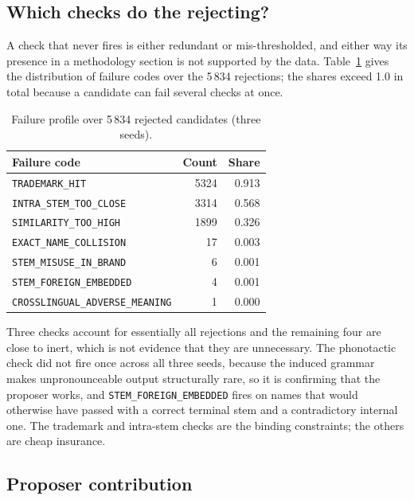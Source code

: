 \documentclass[conference]{IEEEtran}
\newcommand{\code}[1]{\texttt{\footnotesize #1}}
\begin{document}
\subsection{Which checks do the rejecting?}

A check that never fires is either redundant or mis-thresholded, and either way
its presence in a methodology section is not supported by the data.
Table~\ref{tab:failures} gives the distribution of failure codes over the
5\,834 rejections; the shares exceed 1.0 in total because a candidate can fail
several checks at once.

\begin{table}[t]
\caption{Failure profile over 5\,834 rejected candidates (three seeds).}
\label{tab:failures}
\centering
\scriptsize
\begin{tabular}{lrr}
\toprule
Failure code & Count & Share \\
\midrule
\code{TRADEMARK\_HIT}                & 5324 & 0.913 \\
\code{INTRA\_STEM\_TOO\_CLOSE}       & 3314 & 0.568 \\
\code{SIMILARITY\_TOO\_HIGH}         & 1899 & 0.326 \\
\code{EXACT\_NAME\_COLLISION}        &   17 & 0.003 \\
\code{STEM\_MISUSE\_IN\_BRAND}       &    6 & 0.001 \\
\code{STEM\_FOREIGN\_EMBEDDED}       &    4 & 0.001 \\
\code{CROSSLINGUAL\_ADVERSE\_MEANING}&    1 & 0.000 \\
\bottomrule
\end{tabular}
\end{table}

Three checks account for essentially all rejections and the remaining four are
close to inert, which is not evidence that they are unnecessary. The
phonotactic check did not fire once across all three seeds, because the induced
grammar makes unpronounceable output structurally rare, so it is confirming that
the proposer works, and \code{STEM\_FOREIGN\_EMBEDDED} fires on names that would
otherwise have passed with a correct terminal stem and a contradictory internal
one. The trademark and intra-stem checks are the binding constraints; the others
are cheap insurance.

\subsection{Proposer contribution}
\end{document}
